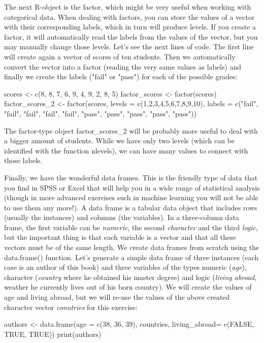 The next R-object is the factor, which might be very useful when working with categorical data. When dealing with factors, you can store the values of a vector with their corresponding labels, which in turn will produce levels. If you create a factor, it will automatically read the labels from the values of the vector, but you may manually change those levels. Let's see the next lines of code. The first line will create again a vector of scores of ten students. Then we automatically convert the vector into a factor (reading the very same values as labels) and finally we create the labels ("fail" or "pass") for each of the possible grades:

\begin{exampler}
scores <- c(8, 8, 7, 6, 9, 4, 9, 2, 8, 5)
factor_scores <- factor(scores)
factor_scores_2 <- factor(scores, levels = c(1,2,3,4,5,6,7,8,9,10), labels = c("fail", "fail", "fail", "fail", "fail", "pass", "pass", "pass", "pass", "pass"))
\end{exampler}

The factor-type object factor\_scores\_2 will be probably more useful to deal with a bigger amount of students. While we have only two levels (which can be identified with the function nlevels), we can have many values to connect with those labels.

Finally, we have the wonderful data frames. This is the friendly type of data that you find in SPSS or Excel that will help you in a wide range of statistical analysis (though in more advanced exercises such in machine learning you will not be able to use them any more!).  A data frame is a tabular data object that includes rows (usually the instances) and columns (the variables). In a three-column data frame, the first variable can be \emph{numeric}, the second \emph{character} and the third \emph{logic}, but the important thing is that each variable is a vector and that all these vectors must be of the same length. We create data frames from scratch using the data.frame() function.  Let’s generate a simple data frame of three instances (each case is an author of this book) and three variables of the types numeric (\emph{age}), character (\emph{country} where he obtained his master degree) and logic (\emph{living abroad}, weather he currently lives out of his born country). We will create the values of age and living abroad, but we will re-use the values of the above created character vector \emph{conutries} for this exercise:

\begin{exampler}
authors <- data.frame(age = c(38, 36, 39), countries, living_abroad= c(FALSE, TRUE, TRUE))
print(authors)
\end{exampler}

